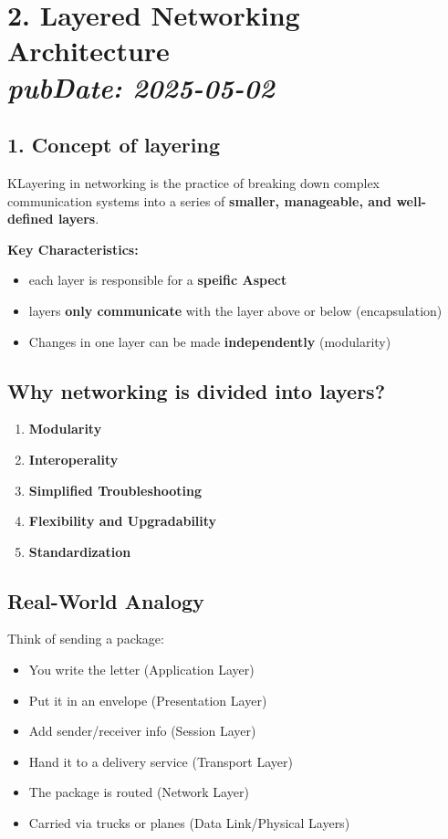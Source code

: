 \documentclass[11pt]{article}
\begin{document}
\newpage
\section*{2. Layered Networking Architecture \\ \normalsize{\textit{pubDate: 2025-05-02}}}

\subsection*{1. Concept of layering}
KLayering in networking is the practice of breaking down complex communication systems into a series of \textbf{smaller, manageable, and well-defined layers}.

\textbf{Key Characteristics:}
\begin{itemize}
    \item each layer is responsible for a \textbf{speific Aspect}
    \item layers \textbf{only communicate} with the layer above or below (encapsulation)
    \item Changes in one layer can be made \textbf{independently} (modularity)
\end{itemize}

\subsection*{Why networking is divided into layers?}
\begin{enumerate}
    \item \textbf{Modularity}
    \item \textbf{Interoperality}
    \item \textbf{Simplified Troubleshooting}
    \item \textbf{Flexibility and Upgradability}
    \item \textbf{Standardization}
\end{enumerate}

\subsection*{Real-World Analogy}
Think of sending a package:
\begin{itemize}
    \item You write the letter (Application Layer)
    \item Put it in an envelope (Presentation Layer)
    \item Add sender/receiver info (Session Layer)
    \item Hand it to a delivery service (Transport Layer)
    \item The package is routed (Network Layer)
    \item Carried via trucks or planes (Data Link/Physical Layers)
\end{itemize}
\end{document}
